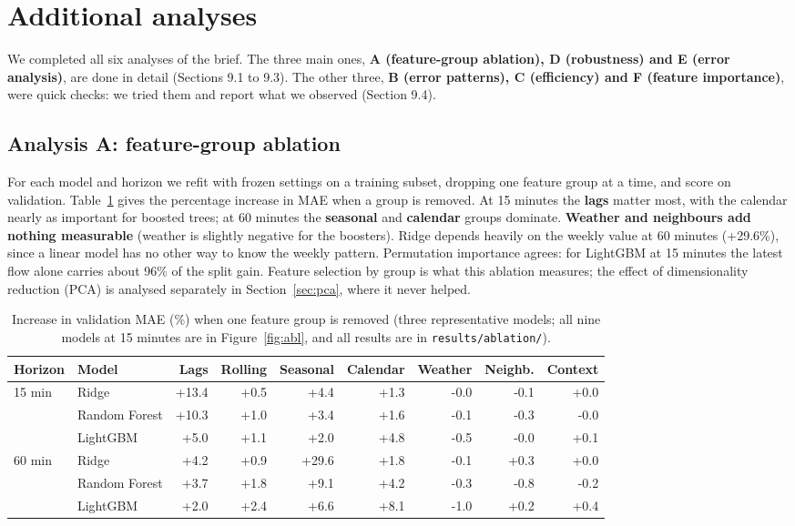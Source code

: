﻿\documentclass[11pt,a4paper]{article}
\newcommand{\code}[1]{\texttt{#1}}
\begin{document}
\section{Additional analyses}
We completed all six analyses of the brief. The three main ones, \textbf{A (feature-group ablation), D (robustness) and E (error analysis)}, are done in detail (Sections 9.1 to 9.3). The other three, \textbf{B (error patterns), C (efficiency) and F (feature importance)}, were quick checks: we tried them and report what we observed (Section 9.4).
\subsection{Analysis A: feature-group ablation}
For each model and horizon we refit with frozen settings on a training subset, dropping one feature group at a time, and score on validation. Table~\ref{tab:abl} gives the percentage increase in MAE when a group is removed.
At 15 minutes the \textbf{lags} matter most, with the calendar nearly as important for boosted trees; at 60 minutes the \textbf{seasonal} and \textbf{calendar} groups dominate. \textbf{Weather and neighbours add nothing measurable} (weather is slightly negative for the boosters). Ridge depends heavily on the weekly value at 60 minutes (+29.6\%), since a linear model has no other way to know the weekly pattern.
Permutation importance agrees: for LightGBM at 15 minutes the latest flow alone carries about 96\% of the split gain. Feature selection by group is what this ablation measures; the effect of dimensionality reduction (PCA) is analysed separately in Section~\ref{sec:pca}, where it never helped.

\begin{table}[H]\centering\small
\begin{tabular}{llrrrrrrr}
\toprule Horizon & Model & Lags & Rolling & Seasonal & Calendar & Weather & Neighb. & Context \\ \midrule
15 min & Ridge & +13.4 & +0.5 & +4.4 & +1.3 & -0.0 & -0.1 & +0.0 \\
 & Random Forest & +10.3 & +1.0 & +3.4 & +1.6 & -0.1 & -0.3 & -0.0 \\
 & LightGBM & +5.0 & +1.1 & +2.0 & +4.8 & -0.5 & -0.0 & +0.1 \\ \midrule
60 min & Ridge & +4.2 & +0.9 & +29.6 & +1.8 & -0.1 & +0.3 & +0.0 \\
 & Random Forest & +3.7 & +1.8 & +9.1 & +4.2 & -0.3 & -0.8 & -0.2 \\
 & LightGBM & +2.0 & +2.4 & +6.6 & +8.1 & -1.0 & +0.2 & +0.4 \\ \bottomrule
\end{tabular}
\caption{Increase in validation MAE (\%) when one feature group is removed (three representative models; all nine models at 15 minutes are in Figure~\ref{fig:abl}, and all results are in \code{results/ablation/}).}\label{tab:abl}
\end{table}
\end{document}
